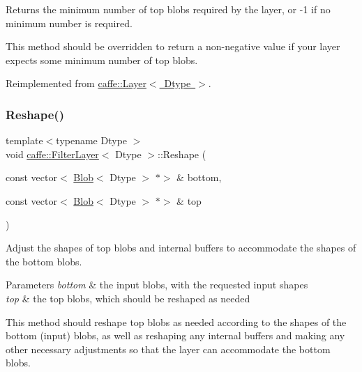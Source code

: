 Returns the minimum number of top blobs required by the layer, or -\/1 if no minimum number is required. 

This method should be overridden to return a non-\/negative value if your layer expects some minimum number of top blobs. 

Reimplemented from \mbox{\hyperlink{classcaffe_1_1_layer_ab9e4c8d642e413948b131d851a8462a4}{caffe\+::\+Layer$<$ Dtype $>$}}.

\mbox{\label{classcaffe_1_1_filter_layer_ade673aa44e466adbe3aa79531a7c7484}} 
\subsubsection{\texorpdfstring{Reshape()}{Reshape()}\hspace{0.1cm}{\footnotesize\ttfamily [1/2]}}
{\footnotesize\ttfamily template$<$typename Dtype $>$ \\
void \mbox{\hyperlink{classcaffe_1_1_filter_layer}{caffe\+::\+Filter\+Layer}}$<$ Dtype $>$\+::Reshape (\begin{DoxyParamCaption}\item[{const vector$<$ \mbox{\hyperlink{classcaffe_1_1_blob}{Blob}}$<$ Dtype $>$ $\ast$$>$ \&}]{bottom,  }\item[{const vector$<$ \mbox{\hyperlink{classcaffe_1_1_blob}{Blob}}$<$ Dtype $>$ $\ast$$>$ \&}]{top }\end{DoxyParamCaption})\hspace{0.3cm}{\ttfamily [virtual]}}



Adjust the shapes of top blobs and internal buffers to accommodate the shapes of the bottom blobs. 


\begin{DoxyParams}{Parameters}
{\em bottom} & the input blobs, with the requested input shapes \\
\hline
{\em top} & the top blobs, which should be reshaped as needed\\
\hline
\end{DoxyParams}
This method should reshape top blobs as needed according to the shapes of the bottom (input) blobs, as well as reshaping any internal buffers and making any other necessary adjustments so that the layer can accommodate the bottom blobs. 

